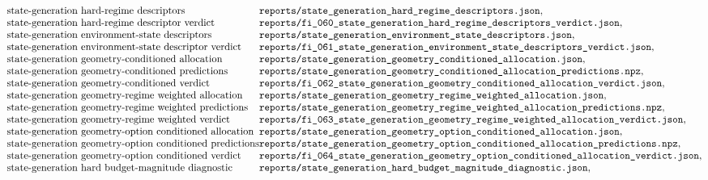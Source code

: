 $$\begin{array}{@{}l@{}l@{}}
\text{state-generation hard-regime descriptors} & \texttt{reports/state\_generation\_hard\_regime\_descriptors.json},\\
\text{state-generation hard-regime descriptor verdict} & \texttt{reports/fi\_060\_state\_generation\_hard\_regime\_descriptors\_verdict.json},\\
\text{state-generation environment-state descriptors} & \texttt{reports/state\_generation\_environment\_state\_descriptors.json},\\
\text{state-generation environment-state descriptor verdict} & \texttt{reports/fi\_061\_state\_generation\_environment\_state\_descriptors\_verdict.json},\\
\text{state-generation geometry-conditioned allocation} & \texttt{reports/state\_generation\_geometry\_conditioned\_allocation.json},\\
\text{state-generation geometry-conditioned predictions} & \texttt{reports/state\_generation\_geometry\_conditioned\_allocation\_predictions.npz},\\
\text{state-generation geometry-conditioned verdict} & \texttt{reports/fi\_062\_state\_generation\_geometry\_conditioned\_allocation\_verdict.json},\\
\text{state-generation geometry-regime weighted allocation} & \texttt{reports/state\_generation\_geometry\_regime\_weighted\_allocation.json},\\
\text{state-generation geometry-regime weighted predictions} & \texttt{reports/state\_generation\_geometry\_regime\_weighted\_allocation\_predictions.npz},\\
\text{state-generation geometry-regime weighted verdict} & \texttt{reports/fi\_063\_state\_generation\_geometry\_regime\_weighted\_allocation\_verdict.json},\\
\text{state-generation geometry-option conditioned allocation} & \texttt{reports/state\_generation\_geometry\_option\_conditioned\_allocation.json},\\
\text{state-generation geometry-option conditioned predictions} & \texttt{reports/state\_generation\_geometry\_option\_conditioned\_allocation\_predictions.npz},\\
\text{state-generation geometry-option conditioned verdict} & \texttt{reports/fi\_064\_state\_generation\_geometry\_option\_conditioned\_allocation\_verdict.json},\\
\text{state-generation hard budget-magnitude diagnostic} & \texttt{reports/state\_generation\_hard\_budget\_magnitude\_diagnostic.json},\\

\end{array}$$
